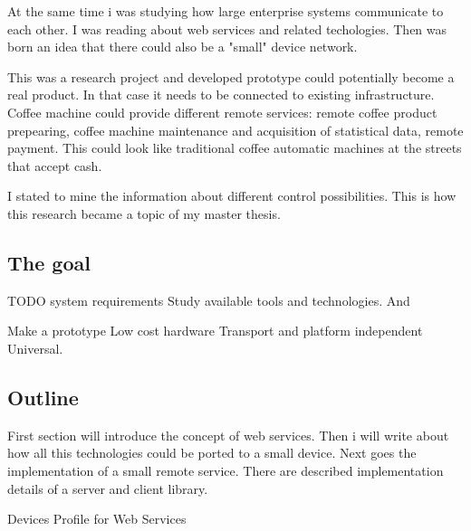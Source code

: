 At the same time i was studying how large enterprise systems communicate to each other. I was reading about web services and related techologies.
Then was born an idea that there could also be a "small" device network. 

This was a research project and developed prototype could potentially become a real product.
In that case it needs to be connected to existing infrastructure.
Coffee machine could provide different remote services: remote coffee product prepearing, coffee machine maintenance and acquisition of statistical data, remote payment.
This could look like traditional coffee automatic machines at the streets that accept cash.

I stated to mine the information about different control possibilities.
This is how this research became a topic of my master thesis. 

\subsection{The goal}
TODO system requirements
Study available tools and technologies.
And

Make a prototype
Low cost hardware
Transport and platform independent
Universal.



\subsection{Outline}

First section will introduce the concept of web services.
Then i will write about how all this technologies could be ported to a small device.
Next goes the implementation of a small remote service. There are described implementation details of a server and client library.

Devices Profile for Web Services
